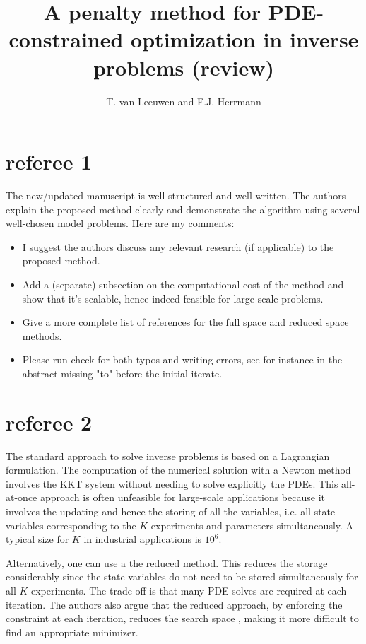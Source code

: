 \documentclass[12pt]{article}
\begin{document}
 
\title{A penalty method for PDE-constrained optimization in inverse problems (review)} 
\author{T. van Leeuwen and F.J. Herrmann} 
\date{} 
\maketitle 
\clearpage
\section{referee 1}
The new/updated manuscript is well structured and well written. The authors explain the proposed method clearly and demonstrate the algorithm using several well-chosen model problems. Here are my comments: 

\begin{itemize}
\item I suggest the authors discuss any relevant research (if applicable) to the proposed method. 

\item Add a (separate) subsection on the computational cost of the method and show that it's scalable, hence indeed feasible for large-scale problems. 

\item Give a more complete list of references for the full space and reduced space methods. 

\item Please run check for both typos and writing errors, see for instance in the abstract missing "to" before the initial iterate. 
\end{itemize}
\clearpage
\section{referee 2}
The standard approach to solve inverse problems is based on a Lagrangian formulation. The computation of the numerical solution with a Newton method involves the 
KKT system without needing to solve explicitly the PDEs. This all-at-once approach is often unfeasible for large-scale applications because it involves the updating and hence the storing of all the variables, i.e. all state variables corresponding to the $K$ experiments and parameters simultaneously. A typical size for $K$ in industrial applications is $10^6$. 

Alternatively, one can use a the reduced method. 
This reduces the storage considerably since the state variables do not need to be stored simultaneously for all $K$ experiments. 
The trade-off is that many PDE-solves are required at each iteration. 
The authors also argue that the reduced approach, by enforcing the constraint at each iteration, reduces the search space , making it more difficult to find an appropriate minimizer. 
\end{document}
